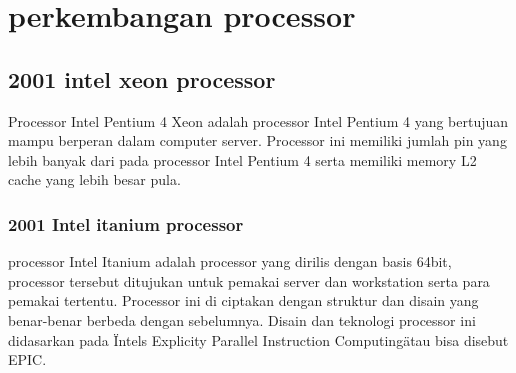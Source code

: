 \section{perkembangan processor}
	\subsection{2001 intel xeon processor}
	Processor Intel Pentium 4 Xeon adalah processor Intel Pentium 4 yang bertujuan mampu berperan dalam computer server. Processor ini memiliki jumlah pin yang lebih banyak dari pada processor Intel Pentium 4 serta memiliki memory L2 cache yang lebih besar pula.
	\subsubsection{2001 Intel itanium processor}
	processor Intel Itanium adalah processor yang dirilis dengan basis 64bit, processor tersebut ditujukan untuk pemakai server dan workstation serta para pemakai tertentu. Processor ini di ciptakan dengan struktur dan disain yang benar-benar berbeda dengan sebelumnya. Disain dan teknologi processor ini didasarkan pada \"Intels Explicity Parallel Instruction Computing\" atau bisa disebut EPIC.